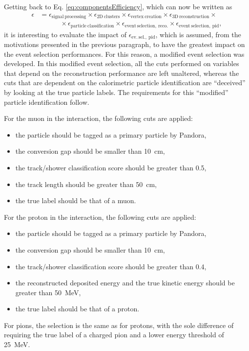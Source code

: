 Getting back to Eq. \eqref{eq:componentsEfficiency}, which can now be written as \begin{equation}
    \begin{aligned}
        \epsilon &= 
        \epsilon_\mathrm{signal\ processing} \times 
        \epsilon_\mathrm{2D\ clusters} \times 
        \epsilon_\mathrm{vertex\ creation} \times 
        \epsilon_\mathrm{3D\ reconstruction} \times \\
        &\quad\quad\quad\times
        \epsilon_\mathrm{particle\ classification} \times 
        \epsilon_\mathrm{event\ selection,\ reco.} \times 
        \epsilon_\mathrm{event\ selection,\ pid},
    \end{aligned}
\end{equation} it is interesting to evaluate the impact of $\epsilon_\mathrm{ev.\ sel.,\ pid}$, which is assumed, from the motivations presented in the previous paragraph, to have the greatest impact on the event selection performances. For this reason, a modified event selection was developed. In this modified event selection, all the cuts performed on variables that depend on the reconstruction performance are left unaltered, whereas the cuts that are dependent on the calorimetric particle identification are ``deceived'' by looking at the true particle labels. The requirements for this ``modified'' particle identification follow.  

\noindent
For the muon in the interaction, the following cuts are applied: \begin{itemize}
    \item the particle should be tagged as a primary particle by Pandora,
    \item the conversion gap should be smaller than \SI{10}{\cm},
    \item the track/shower classification score should be greater than 0.5,
    \item the track length should be greater than \SI{50}{\cm},
    \item the true label should be that of a muon. 
\end{itemize}
For the proton in the interaction, the following cuts are applied: \begin{itemize}
    \item the particle should be tagged as a primary particle by Pandora,
    \item the conversion gap should be smaller than \SI{10}{\cm},
    \item the track/shower classification score should be greater than 0.4,
    \item the reconstructed deposited energy and the true kinetic energy should be greater than \SI{50}{\MeV},
    \item the true label should be that of a proton.
\end{itemize}
For pions, the selection is the same as for protons, with the sole difference of requiring the true label of a charged pion and a lower energy threshold of \SI{25}{\MeV}. 

